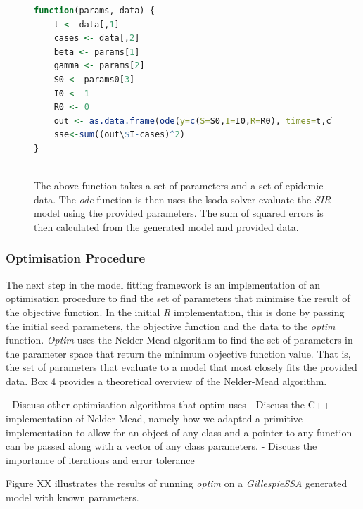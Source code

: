 \documentclass[11pt, a4paper, oneside,titlepage]{article}
\begin{document}
\begin{center}
\begin{figure}
\begin{lstlisting}[language=R, style=customc]
function(params, data) {
    t <- data[,1]
    cases <- data[,2]
    beta <- params[1]
    gamma <- params[2]
    S0 <- params0[3]
    I0 <- 1
    R0 <- 0
    out <- as.data.frame(ode(y=c(S=S0,I=I0,R=R0), times=t,closed.sir.model,parms=c(beta,gamma), atol=1e-15,hmax=1/120))
    sse<-sum((out\$I-cases)^2)
}



\end{lstlisting}
\caption{The above function takes a set of parameters and a set of
  epidemic data. The \emph{ode} function is then uses the lsoda solver
  evaluate the \emph{SIR} model using the provided parameters. The sum of squared
  errors is then calculated from the generated model and provided data.}
\end{figure}
\end{center}


\subsubsection{Optimisation Procedure}
The next step in the model fitting framework is an implementation of
an optimisation procedure to find the set of parameters that minimise
the result of the objective function. In the initial \emph{R}
implementation, this is done by passing the initial seed parameters,
the objective function and the data to the \emph{optim}
function. \emph{Optim} uses the Nelder-Mead algorithm to find the set
of parameters in the parameter space that return the minimum objective
function value. That is, the set of parameters that evaluate to a
model that most closely fits the provided data. Box 4 provides a
theoretical overview of the Nelder-Mead algorithm.

- Discuss other optimisation algorithms that optim uses
- Discuss the C++ implementation of Nelder-Mead, namely how we adapted
 a primitive implementation to allow for an object of any class and a pointer to
 any function can be passed along with a vector of any class
 parameters.
- Discuss the importance of iterations and error tolerance

Figure XX illustrates the results of running \emph{optim} on a
\emph{GillespieSSA} generated model with known parameters.
\end{document}
